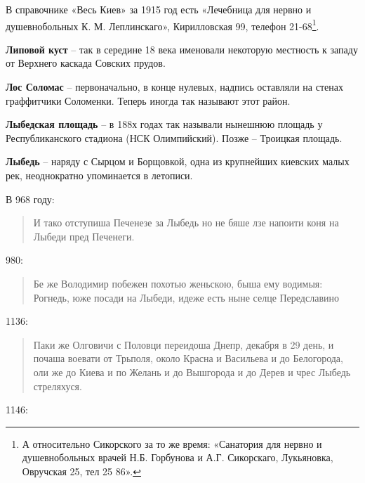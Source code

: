 В справочнике «Весь Киев» за 1915 год есть «Лечебница для нервно и душевнобольных К. М. Леплинскаго», Кирилловская 99, телефон 21-68\footnote{А относительно Сикорского за то же время: «Санатория для нервно и душевнобольных врачей Н.Б. Горбунова и А.Г. Сикорскаго, Лукьяновка, Овручская 25, тел 25 86».}. 
\\

\medskip

\textbf{Липовой куст} – так в середине 18 века именовали некоторую местность к западу от Верхнего каскада Совских прудов.\\

\medskip

\textbf{Лос Соломас} – первоначально, в конце нулевых, надпись оставляли на стенах граффитчики Соломенки. Теперь иногда так называют этот район.\\

\medskip

\textbf{Лыбедская площадь} – в 188х годах так называли нынешнюю площадь у Республиканского стадиона (НСК Олимпийский). Позже – Троицкая площадь.\\

\medskip


\textbf{Лыбедь} – наряду с Сырцом и Борщовкой, одна из крупнейших киевских малых рек, неоднократно упоминается в летописи.

В 968 году:

\begin{quotation}
\noindent И тако отступиша Печенезе за Лыбедь но не бяше лзе напоити коня на Лыбеди пред Печенеги.
\end{quotation}

980:

\begin{quotation}
\noindent Бе же Володимир побежен похотью женьскою, быша ему водимыя: Рогнедь, юже посади на Лыбеди, идеже есть ныне селце Передславино
\end{quotation}

1136:

\begin{quotation}
\noindent Паки же Олговичи с Половци переидоша Днепр, декабря в 29 день, и почаша воевати от Трьполя, около Красна и Васильева и до Белогорода, оли же до Киева и по Желань и до Вышгорода и до Дерев и чрес Лыбедь стреляхуся.
\end{quotation}

1146:

